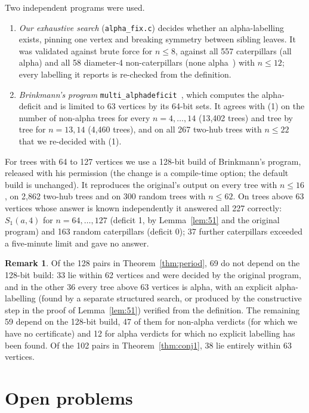 \documentclass[11pt]{amsart}
\theoremstyle{definition}
\newtheorem{remark}[theorem]{Remark}
\begin{document}
Two independent programs were used.
\begin{enumerate}
\item \emph{Our exhaustive search} (\texttt{alpha\_fix.c}) decides whether an alpha-labelling exists, pinning one
  vertex and breaking symmetry between sibling leaves. It was validated against brute force for $n\le 8$,
  against all 557 caterpillars (all alpha) and all 58 diameter-4 non-caterpillars (none alpha~\cite{hkr}) with
  $n\le 12$; every labelling it reports is re-checked from the definition.
\item \emph{Brinkmann's program} \texttt{multi\_alphadeficit}~\cite{bcmrs}, which computes the alpha-deficit and
  is limited to 63 vertices by its 64-bit sets. It agrees with (1) on the number of non-alpha trees for every
  $n=4,\dots,14$ (13{,}402 trees) and tree by tree for $n=13,14$ (4{,}460 trees), and on all 267 two-hub trees
  with $n\le 22$ that we re-decided with (1).
\end{enumerate}
For trees with 64 to 127 vertices we use a 128-bit build of Brinkmann's program, released with his permission
(the change is a compile-time option; the default build is unchanged). It reproduces the original's output on
every tree with $n\le 16$, on 2{,}862 two-hub trees and on 300 random trees with $n\le 62$. On trees above
63 vertices whose answer is known independently it answered all 227 correctly: $S_1(a,4)$ for $n=64,\dots,127$
(deficit 1, by Lemma~\ref{lem:51} and the original program) and 163 random caterpillars (deficit 0); 37 further
caterpillars exceeded a five-minute limit and gave no answer.

\begin{remark}
Of the 128 pairs in Theorem~\ref{thm:period}, 69 do not depend on the 128-bit build: 33 lie within 62 vertices
and were decided by the original program, and in the other 36 every tree above 63 vertices is alpha, with an
explicit alpha-labelling (found by a separate structured search, or produced by the constructive step in the proof
of Lemma~\ref{lem:51}) verified from the definition. The remaining 59
depend on the 128-bit build, 47 of them for non-alpha verdicts (for which we have no certificate) and 12 for
alpha verdicts for which no explicit labelling has been found. Of the 102 pairs in Theorem~\ref{thm:conj1},
38 lie entirely within 63 vertices.
\end{remark}

\section{Open problems}
\end{document}
